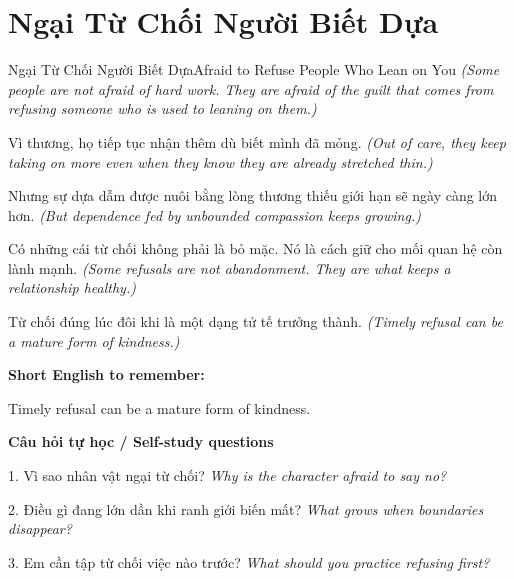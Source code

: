 \section{Ngại Từ Chối Người Biết Dựa}
\begin{truyen}{Ngại Từ Chối Người Biết Dựa}{Afraid to Refuse People Who Lean on You}
\textit{(Some people are not afraid of hard work. They are afraid of the guilt that comes from refusing someone who is used to leaning on them.)}

Vì thương, họ tiếp tục nhận thêm dù biết mình đã mỏng.
\textit{(Out of care, they keep taking on more even when they know they are already stretched thin.)}

Nhưng sự dựa dẫm được nuôi bằng lòng thương thiếu giới hạn sẽ ngày càng lớn hơn.
\textit{(But dependence fed by unbounded compassion keeps growing.)}

Có những cái từ chối không phải là bỏ mặc. Nó là cách giữ cho mối quan hệ còn lành mạnh.
\textit{(Some refusals are not abandonment. They are what keeps a relationship healthy.)}

\end{truyen}

\begin{baihoc}
Từ chối đúng lúc đôi khi là một dạng tử tế trưởng thành.
\textit{(Timely refusal can be a mature form of kindness.)}
\end{baihoc}

\begin{ghinhoanh}
\textbf{Short English to remember:}

Timely refusal can be a mature form of kindness.

\end{ghinhoanh}

\begin{tuhocnhanh}
\textbf{Câu hỏi tự học / Self-study questions}

1. Vì sao nhân vật ngại từ chối? \textit{Why is the character afraid to say no?}

2. Điều gì đang lớn dần khi ranh giới biến mất? \textit{What grows when boundaries disappear?}

3. Em cần tập từ chối việc nào trước? \textit{What should you practice refusing first?}
\end{tuhocnhanh}
\ngancach

